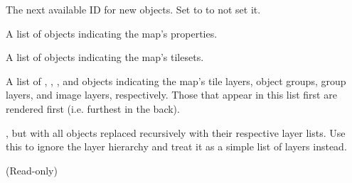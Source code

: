 \documentclass[letterpaper,10pt,english]{sphinxmanual}
\begin{document}
\begin{fulllineitems}

\begin{fulllineitems}
\label{index:tmx.TileMap.nextobjectid}
The next available ID for new objects.  Set to  to
not set it.

\end{fulllineitems}


\begin{fulllineitems}
\label{index:tmx.TileMap.properties}
A list of {\hyperref[index:tmx.Property]{\emph{}}} objects indicating the map's
properties.

\end{fulllineitems}


\begin{fulllineitems}
\label{index:tmx.TileMap.tilesets}
A list of {\hyperref[index:tmx.Tileset]{\emph{}}} objects indicating the map's tilesets.

\end{fulllineitems}


\begin{fulllineitems}
\label{index:tmx.TileMap.layers}
A list of {\hyperref[index:tmx.Layer]{\emph{}}}, {\hyperref[index:tmx.ObjectGroup]{\emph{}}},
{\hyperref[index:tmx.GroupLayer]{\emph{}}}, and {\hyperref[index:tmx.ImageLayer]{\emph{}}} objects indicating
the map's tile layers, object groups, group layers, and image
layers, respectively.  Those that appear in this list first are
rendered first (i.e. furthest in the back).

\end{fulllineitems}


\begin{fulllineitems}
\label{index:tmx.TileMap.layers_list}
{\hyperref[index:tmx.TileMap.layers]{\emph{}}}, but with all {\hyperref[index:tmx.GroupLayer]{\emph{}}} objects
replaced recursively with their respective layer lists.  Use this
to ignore the layer hierarchy and treat it as a simple list of
layers instead.

(Read-only)

\end{fulllineitems}


\end{fulllineitems}
\end{document}
